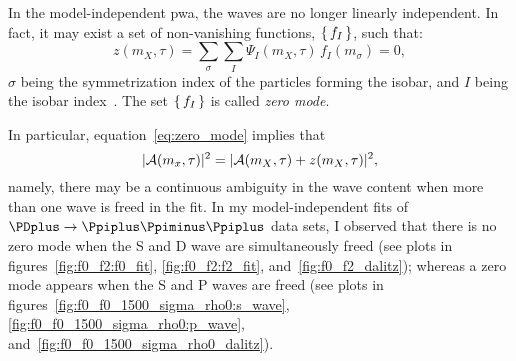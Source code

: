 In the model-independent \ac{pwa}, the waves are no longer linearly independent.
In fact, it may exist a set of non-vanishing functions, $\set{f_I}$, such that:
\begin{equation}\label{eq:zero_mode}
    z(m_X,\tau) = \sum_{\sigma} \sum_{I} \Psi_I(m_X,\tau)\,f_I(m_\sigma) = 0,
\end{equation}
$\sigma$ being the symmetrization index of the particles forming the isobar, and $I$ being the isobar index~\cite{green_krinn_paul}.
The set $\set{f_I}$ is called \emph{zero mode}.


In particular, equation~\eqref{eq:zero_mode} implies that
\begin{equation}
    \lvert\mathcal{A}(m_x,\tau)\rvert^2 = \lvert\mathcal{A}(m_X, \tau) + z(m_X,\tau)\rvert^2,
\end{equation}
namely, there may be a continuous ambiguity in the wave content when more than one wave is freed in the fit.
In my model-independent fits of $\PDplus\to\Ppiplus\Ppiminus\Ppiplus$ data sets, I observed that there is no zero mode when the S and D wave are simultaneously freed (see plots in figures~\ref{fig:f0_f2:f0_fit}, \ref{fig:f0_f2:f2_fit}, and~\ref{fig:f0_f2_dalitz}); 
whereas a zero mode appears when the S and P waves are freed (see plots in figures~\ref{fig:f0_f0_1500_sigma_rho0:s_wave}, \ref{fig:f0_f0_1500_sigma_rho0:p_wave}, and~\ref{fig:f0_f0_1500_sigma_rho0_dalitz}).
